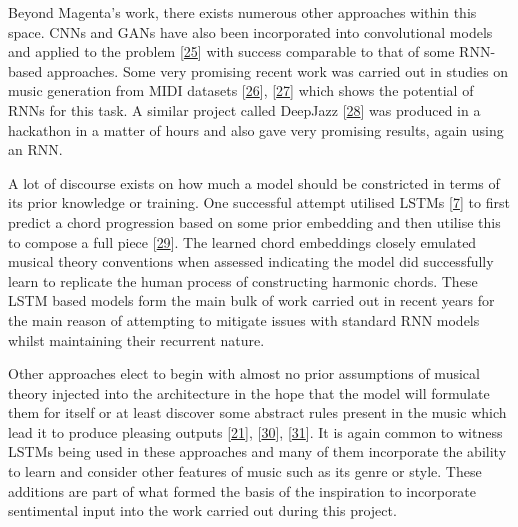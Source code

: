 \documentclass[12pt,]{article}
\begin{document}
Beyond Magenta's work, there exists numerous other approaches within
this space. CNNs and GANs have also been incorporated into convolutional
models and applied to the problem
{[}\protect\hyperlink{ref-yang2017midinet}{25}{]} with success
comparable to that of some RNN-based approaches. Some very promising
recent work was carried out in studies on music generation from MIDI
datasets {[}\protect\hyperlink{ref-hilschermusic}{26}{]},
{[}\protect\hyperlink{ref-wyse2018real}{27}{]} which shows the potential
of RNNs for this task. A similar project called DeepJazz
{[}\protect\hyperlink{ref-kim2016deepjazz}{28}{]} was produced in a
hackathon in a matter of hours and also gave very promising results,
again using an RNN.

A lot of discourse exists on how much a model should be constricted in
terms of its prior knowledge or training. One successful attempt
utilised LSTMs {[}\protect\hyperlink{ref-gers1999learning}{7}{]} to
first predict a chord progression based on some prior embedding and then
utilise this to compose a full piece
{[}\protect\hyperlink{ref-brunner2017jambot}{29}{]}. The learned chord
embeddings closely emulated musical theory conventions when assessed
indicating the model did successfully learn to replicate the human
process of constructing harmonic chords. These LSTM based models form
the main bulk of work carried out in recent years for the main reason of
attempting to mitigate issues with standard RNN models whilst
maintaining their recurrent nature.

Other approaches elect to begin with almost no prior assumptions of
musical theory injected into the architecture in the hope that the model
will formulate them for itself or at least discover some abstract rules
present in the music which lead it to produce pleasing outputs
{[}\protect\hyperlink{ref-boulanger2012modeling}{21}{]},
{[}\protect\hyperlink{ref-kotecha2018generating}{30}{]},
{[}\protect\hyperlink{ref-colombo2018bachprop}{31}{]}. It is again
common to witness LSTMs being used in these approaches and many of them
incorporate the ability to learn and consider other features of music
such as its genre or style. These additions are part of what formed the
basis of the inspiration to incorporate sentimental input into the work
carried out during this project.
\end{document}
